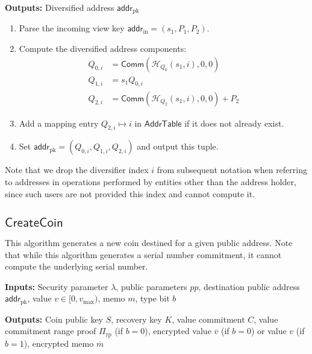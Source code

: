 \documentclass{llncs}
\newcommand{\hash}{\mathcal{H}}
\newcommand{\func}[1]{\mathsf{#1}}
\newcommand{\addr}{\func{addr}}
\newcommand{\comm}{\func{Comm}}
\begin{document}
\textbf{Outputs:} Diversified address $\addr_{\text{pk}}$

\begin{enumerate}
\item Parse the incoming view key $\addr_{\text{in}} = (s_1, P_1, P_2)$.
\item Compute the diversified address components:
\begin{align*}
Q_{0,i} &= \comm(\hash_{Q_0}(s_1,i),0,0) \\
Q_{1,i} &= s_1 Q_{0,i} \\
Q_{2,i} &= \comm(\hash_{Q_2}(s_1,i),0,0) + P_2
\end{align*}
\item Add a mapping entry $Q_{2,i} \mapsto i$ in $\func{AddrTable}$ if it does not already exist.
\item Set $\addr_{\text{pk}} = (Q_{0,i},Q_{1,i},Q_{2,i})$ and output this tuple.
\end{enumerate}
Note that we drop the diversifier index $i$ from subsequent notation when referring to addresses in operations performed by entities other than the address holder, since such users are not provided this index and cannot compute it.


\subsection{\texorpdfstring{$\func{CreateCoin}$}{CreateCoin}}

This algorithm generates a new coin destined for a given public address.
Note that while this algorithm generates a serial number commitment, it cannot compute the underlying serial number.

\textbf{Inputs:} Security parameter $\lambda$, public parameters $pp$, destination public address $\addr_{\text{pk}}$, value $v \in [0, v_{\text{max}})$, memo $m$, type bit $b$

\textbf{Outputs:} Coin public key $S$, recovery key $K$, value commitment $C$, value commitment range proof $\Pi_{\text{rp}}$ (if $b=0$), encrypted value $\overline{v}$ (if $b=0$) or value $v$ (if $b=1$), encrypted memo $\overline{m}$
\end{document}
